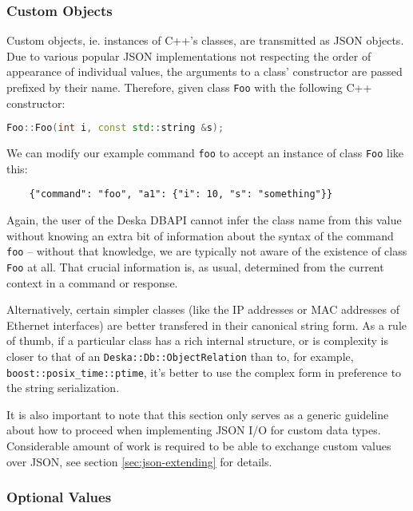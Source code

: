 \documentclass{article}
\begin{document}
\subsubsection{Custom Objects}

Custom objects, ie. instances of C++'s classes, are transmitted as JSON objects. Due to various popular JSON
implementations not respecting the order of appearance of individual values, the arguments to a class' constructor are
passed prefixed by their name.  Therefore, given class {\tt Foo} with the following C++ constructor:

\begin{lstlisting}[language=c++]
    Foo::Foo(int i, const std::string &s);
\end{lstlisting}

We can modify our example command {\tt foo} to accept an instance of class {\tt Foo} like this:

\begin{lstlisting}
    {"command": "foo", "a1": {"i": 10, "s": "something"}}
\end{lstlisting}

Again, the user of the Deska DBAPI cannot infer the class name from this value without knowing an extra bit of
information about the syntax of the command {\tt foo} -- without that knowledge, we are typically not aware of the
existence of class {\tt Foo} at all.  That crucial information is, as usual, determined from the current context in a
command or response.

Alternatively, certain simpler classes (like the IP addresses or MAC addresses of Ethernet interfaces) are better
transfered in their canonical string form.  As a rule of thumb, if a particular class has a rich internal structure, or
is complexity is closer to that of an {\tt Deska::Db::ObjectRelation} than to, for example, {\tt
boost::posix\_time::ptime}, it's better to use the complex form in preference to the string serialization.

It is also important to note that this section only serves as a generic guideline about how to proceed when implementing
JSON I/O for custom data types.  Considerable amount of work is required to be able to exchange custom values over JSON,
see section \ref{sec:json-extending} for details.

\subsubsection{Optional Values}
\end{document}
